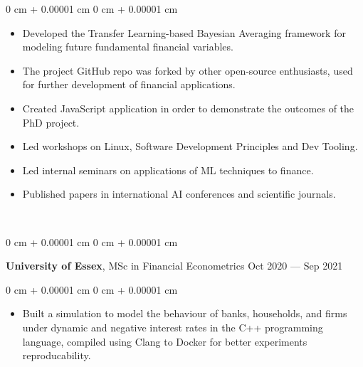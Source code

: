 \documentclass[10pt, letterpaper]{article}
\newenvironment{highlights}{
    \begin{itemize}[
        topsep=0.10 cm,
        parsep=0.10 cm,
        partopsep=0pt,
        itemsep=0pt,
        leftmargin=0 cm + 10pt
    ]
}{
    \end{itemize}
} %
\newenvironment{onecolentry}{
    \begin{adjustwidth}{
        0 cm + 0.00001 cm
    }{
        0 cm + 0.00001 cm
    }
}{
    \end{adjustwidth}
} %
\newenvironment{twocolentry}[2][]{
    \onecolentry
    \def\secondColumn{#2}
    \setcolumnwidth{\fill, 4.5 cm}
    \begin{paracol}{2}
}{
    \switchcolumn \raggedleft \secondColumn
    \end{paracol}
    \endonecolentry
} %
\begin{document}
        \vspace{0.10 cm}
        \begin{onecolentry}
            \begin{highlights}
            \item Developed the Transfer Learning-based Bayesian Averaging framework for modeling future fundamental financial variables.
            \item The project GitHub repo was forked by other open-source enthusiasts, used for further development of financial applications.
            \item Created JavaScript application in order to demonstrate the outcomes of the PhD project.
                \item Led workshops on Linux, Software Development Principles and Dev Tooling.
                \item Led internal seminars on applications of ML techniques to finance.
                \item Published papers in international AI conferences and scientific journals.
            \end{highlights}
        \end{onecolentry}
        ~
        ~
        \begin{twocolentry}{
            Oct 2020 --- Sep 2021 
        }
            \textbf{University of Essex}, MSc in Financial Econometrics\end{twocolentry}

        \vspace{0.10 cm}
        \begin{onecolentry}
            \begin{highlights}
            \item Built a simulation to model the behaviour of banks, households, and firms under dynamic and negative interest rates in the C++ programming language, compiled using Clang to Docker for better experiments reproducability.
            \end{highlights}
        \end{onecolentry}
\end{document}

